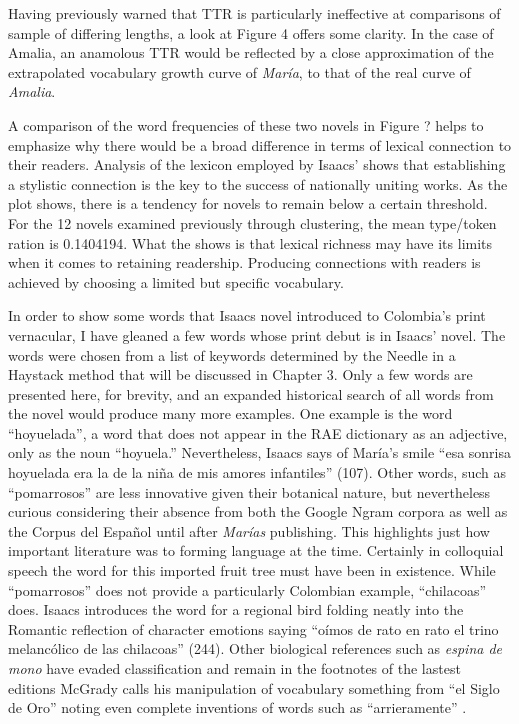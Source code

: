 \documentclass[12pt]{report}
\begin{document}
Having previously warned that TTR is particularly ineffective at comparisons of sample of differing lengths, a look at Figure 4 offers some clarity.
In the case of Amalia, an anamolous TTR would be reflected by a close approximation of the extrapolated vocabulary growth curve of \textit{María}, to that of the real curve of \textit{Amalia}.

A comparison of the word frequencies of these two novels in Figure ? helps to emphasize why there would be a broad difference in terms of lexical connection to their readers.
Analysis of the lexicon employed by Isaacs' shows that establishing a stylistic connection is the key to the success of nationally uniting works. 
As the plot shows, there is a tendency for novels to remain below a certain threshold.
For the 12 novels examined previously through clustering, the mean type/token ration is 0.1404194.
What the shows is that lexical richness may have its limits when it comes to retaining readership. 
Producing connections with readers is achieved by choosing a limited but specific vocabulary.


In order to show some words that Isaacs novel introduced to Colombia's print vernacular, I have gleaned a few words whose print debut is in Isaacs’ novel.
The words were chosen from a list of keywords determined by the Needle in a Haystack method that will be discussed in Chapter 3.
Only a few words are presented here, for brevity, and an expanded historical search of all words from the novel would produce many more examples.
One example is the word \enquote{hoyuelada}, a word that does not appear in the RAE dictionary as an adjective, only as the noun \enquote{hoyuela.}
Nevertheless, Isaacs says of María’s smile \enquote{esa sonrisa hoyuelada era la de la niña de mis amores infantiles} (107).
Other words, such as \enquote{pomarrosos} are less innovative given their botanical nature, but nevertheless curious considering their absence from both the Google Ngram corpora as well as the Corpus del Español until after \textit{Marías} publishing.
This highlights just how important literature was to forming language at the time.
Certainly in colloquial speech the word for this imported fruit tree must have been in existence.
While \enquote{pomarrosos} does not provide a particularly Colombian example, \enquote{chilacoas} does.
Isaacs introduces the word for a regional bird folding neatly into the Romantic reflection of character emotions saying \enquote{oímos de rato en rato el trino melancólico de las chilacoas} (244).
Other biological references such as \textit{espina de mono} have evaded classification and remain in the footnotes of the lastest editions
McGrady calls his manipulation of vocabulary something from \enquote{el Siglo de Oro} noting even complete inventions of words such as \enquote{arrieramente} \autocite[43]{McGrady2012}.
\end{document}
